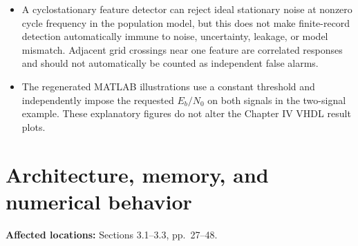 \documentclass[12pt]{article}
\begin{document}
\begin{itemize}
  \item A cyclostationary feature detector can reject ideal stationary noise at nonzero cycle frequency in the population model, but this does not make finite-record detection automatically immune to noise, uncertainty, leakage, or model mismatch. Adjacent grid crossings near one feature are correlated responses and should not automatically be counted as independent false alarms.

  \item The regenerated MATLAB illustrations use a constant threshold and independently impose the requested $E_b/N_0$ on both signals in the two-signal example. These explanatory figures do not alter the Chapter IV VHDL result plots.
\end{itemize}

\section{Architecture, memory, and numerical behavior}

\noindent\textbf{Affected locations:} Sections 3.1--3.3, pp.~27--48.
\end{document}

